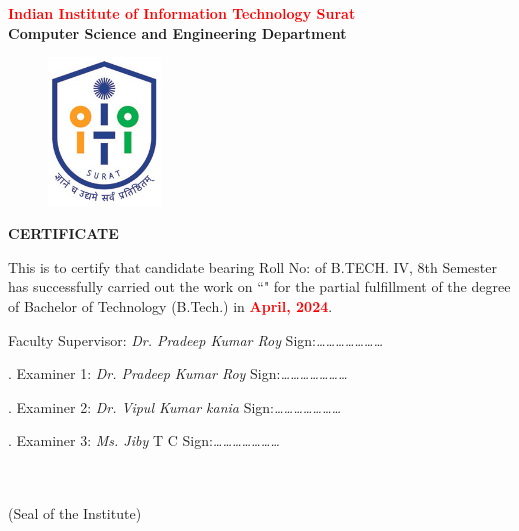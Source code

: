 \thispagestyle{plain}

\begin{center}
{\Large {\bf {\textcolor{red}{Indian Institute of Information Technology Surat}\\Computer Science and Engineering Department}}}
\end{center}

\vspace{1.25cm}
\justify


\begin{figure}[h]
    \centering
    \includegraphics[width=30mm]{Formalities/IIIT_Surat_logo.jpg}
\end{figure}

\begin{center}
{\Large {\bf \uppercase{Certificate}}}
\end{center}
\vspace{1.5cm}
\normalsize
\noindent This is to certify that candidate \textcolor{red}{\textbf{\myname}} bearing Roll No: \textcolor{red}{\textbf{\myrollno}} of B.TECH. IV, 8th Semester has successfully carried out the work on  ``\textcolor{red}{\textbf{\myprojectname}}" for the partial fulfillment of the degree of Bachelor of Technology (B.Tech.) in \textcolor{red}{\textbf{April, 2024}}.

\vspace{3\baselineskip}

\noindent Faculty Supervisor: \emph{Dr. Pradeep Kumar Roy}   \hfill Sign:\emph{…………………}\\
\vspace{1cm}

.  Examiner 1: \emph{ Dr. Pradeep Kumar Roy} \hfill Sign:\emph{…………………}\\
\vspace{0.3cm}

.  Examiner 2: \emph{ Dr. Vipul Kumar kania} \hfill Sign:\emph{…………………}\\
\vspace{0.3cm}

.  Examiner 3: \emph{ Ms. Jiby} T C \hfill Sign:\emph{…………………}\\
\vspace{0.3cm}

\begin{flushright} 

{\small \bf \textcolor{white}{}}\\
{\small \bf \textcolor{white}{}}\\
{\small (Seal of the Institute)} \\
\end{flushright}



